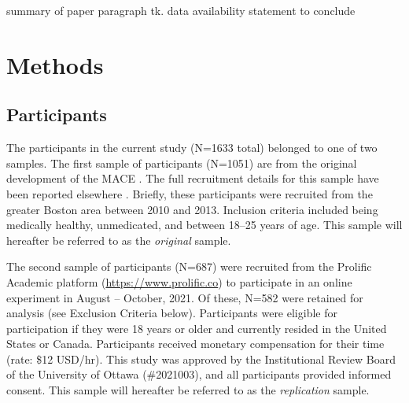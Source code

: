\documentclass[letterpaper,man,natbib,floatsintext,longtable]{apa6}
\begin{document}
summary of paper paragraph tk. data availability statement to conclude

\section{Methods}

\subsection{Participants}

The participants in the current study (N=1633 total) belonged to one of two samples. The first sample of participants (N=1051) are from the original development of the MACE \citep{teicher2015maltreatment}. The full recruitment details for this sample have been reported elsewhere \citep{teicher2015maltreatment}. Briefly, these participants were recruited from the greater Boston area between 2010 and 2013. Inclusion criteria included being medically healthy, unmedicated, and between 18–25 years of age. This sample will hereafter be referred to as the \textit{original} sample. 

The second sample of participants (N=687) were recruited from the Prolific Academic platform (\url{https://www.prolific.co}) to participate in an online experiment in August -- October, 2021. Of these, N=582 were retained for analysis (see Exclusion Criteria below). Participants were eligible for participation if they were 18 years or older and currently resided in the United States or Canada. Participants received monetary compensation for their time (rate: \$12 USD/hr). This study was approved by the Institutional Review Board of the University of Ottawa (\#2021003), and all participants provided informed consent. This sample will hereafter be referred to as the \textit{replication} sample. 
\end{document}
